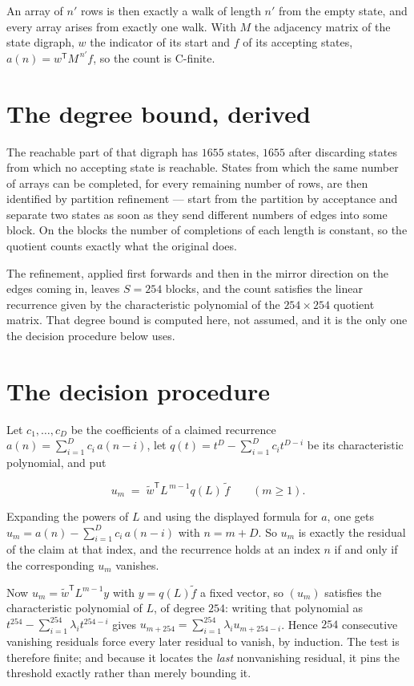 \documentclass[11pt]{article}
\theoremstyle{definition}
\begin{document}
An array of $n'$ rows is then exactly a walk of length $n'$ from the empty state, and every array arises from exactly one walk. With $M$ the adjacency matrix of the state digraph, $w$ the indicator of its start and $f$ of its accepting states, $a(n) = w^{\mathsf T}M^{\,n'}f$, so the count is C-finite.

\section{The degree bound, derived}

The reachable part of that digraph has $1655$ states, $1655$ after discarding states from which no accepting state is reachable. States from which the same number of arrays can be completed, for every remaining number of rows, are then identified by partition refinement --- start from the partition by acceptance and separate two states as soon as they send different numbers of edges into some block. On the blocks the number of completions of each length is constant, so the quotient counts exactly what the original does.

The refinement, applied first forwards and then in the mirror direction on the edges coming in, leaves $S = 254$ blocks, and the count satisfies the linear recurrence given by the characteristic polynomial of the $254 \times 254$ quotient matrix. That degree bound is computed here, not assumed, and it is the only one the decision procedure below uses.

\section{The decision procedure}

Let $c_1,\dots,c_D$ be the coefficients of a claimed recurrence $a(n) = \sum_{i=1}^{D} c_i\,a(n-i)$, let $q(t) = t^{D} - \sum_{i=1}^{D} c_i t^{D-i}$ be its characteristic polynomial, and put

\[u_m \;=\; \tilde w^{\mathsf T} L^{\,m-1} q(L)\,\tilde f \qquad (m \ge 1).\]

Expanding the powers of $L$ and using the displayed formula for $a$, one gets $u_m = a(n) - \sum_{i=1}^{D} c_i\,a(n-i)$ with $n = m + D$. So $u_m$ is exactly the residual of the claim at that index, and the recurrence holds at an index $n$ if and only if the corresponding $u_m$ vanishes.

Now $u_m = \tilde w^{\mathsf T} L^{m-1} y$ with $y = q(L)\tilde f$ a fixed vector, so $(u_m)$ satisfies the characteristic polynomial of $L$, of degree $254$: writing that polynomial as $t^{254} - \sum_{i=1}^{254} \lambda_i t^{254-i}$ gives $u_{m+254} = \sum_{i=1}^{254} \lambda_i u_{m+254-i}$. Hence $254$ consecutive vanishing residuals force every later residual to vanish, by induction. The test is therefore finite; and because it locates the {\itshape last} nonvanishing residual, it pins the threshold exactly rather than merely bounding it.
\end{document}
